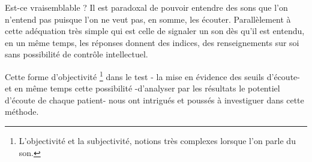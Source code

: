 Est-ce vraisemblable ?
Il est paradoxal de pouvoir  entendre des sons que l'on
n'entend pas puisque l'on ne veut pas, en somme, les écouter. Parallèlement à cette
adéquation très simple qui est celle de signaler un son dès qu'il est 
entendu, en un même temps, les
réponses donnent des indices, des renseignements sur soi sans possibilité de 
contrôle intellectuel.


Cette forme d'objectivité \footnote{L'objectivité et la
  subjectivité, notions très complexes lorsque l'on parle du
  son.} dans le test - la mise en évidence des seuils d'écoute- et en
même temps cette possibilité -d'analyser par les résultats le potentiel d'écoute de
chaque patient- nous ont intrigués et poussés à investiguer dans cette méthode.
 





